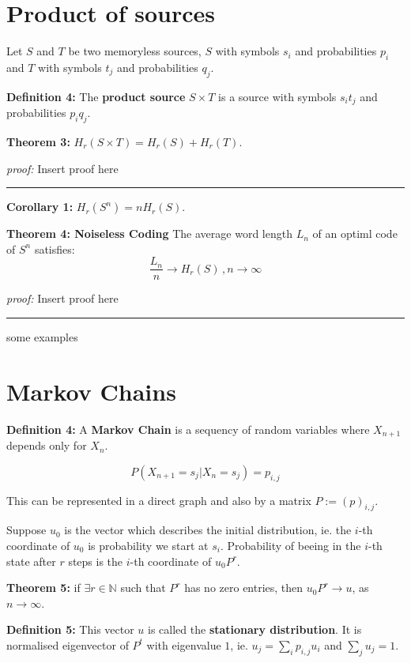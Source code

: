\documentclass{article}
\begin{document}
	\section{Product of sources}
	
\noindent Let $S$ and $T$ be two memoryless sources, $S$ with symbols $s_i$ and probabilities $p_i$ and $T$ with symbols $t_j$ and probabilities $q_j$.

\noindent \textbf{Definition 	4:} The \textbf{product source} $S \times T$ is a source with symbols $s_{i}t_{j}$ and probabilities $p_{i}q_{j}$.

\noindent \textbf{Theorem  3:} $H_{r}(S \times T) = H_{r} (S) + H_{r} (T)$.

\noindent\textit{proof:}  Insert proof here

\noindent
{\color{gray} \rule{\linewidth}{0.5mm} }

\noindent \textbf{Corollary  1:} $H_{r}(S^n) = n H_{r} (S)$. 


\noindent \textbf{Theorem  4: Noiseless Coding} The average word length $L_n$ of an optiml code of $S^n$ satisfies:
$$
\frac{L_n}{n} \longrightarrow H_{r} (S) \, , n \rightarrow \infty
$$ 
  
\noindent\textit{proof:}  Insert proof here

\noindent
{\color{gray} \rule{\linewidth}{0.5mm} }


some examples

	\section{Markov Chains}
	
\noindent \textbf{Definition 	4:} A \textbf{Markov Chain} is a sequency of random variables where $X_{n + 1}$ depends only for $X_{n}$.

$$
P(X_{n + 1} = s_j | X_{n} = s_j ) = p_{i, j}
$$

\noindent This can be represented in a direct graph and also by a matrix $P := (p)_{i, j}$.

\noindent Suppose $u_0$ is the vector which describes the initial distribution, ie. the $i$-th coordinate of $u_0$ is probability we start at $s_i$. Probability of beeing in the $i$-th state after $r$ steps is the $i$-th coordinate of $u_{0} P^{r}$.

\noindent \textbf{Theorem  5:} if $\exists r \in \mathbb{N}$ such that $P^r$ has no zero entries, then $u_{0} P^{r} \longrightarrow u$, as $n \rightarrow \infty$.

\noindent \textbf{Definition 	5:}  This vector $u$ is called the \textbf{stationary distribution}. It is normalised eigenvector of $P^t$ with eigenvalue $1$, ie. $u_j = \sum_i {p_{i, j} u_i}$ and $\sum_{j} {u_j} = 1$.
 	 
\end{document}
